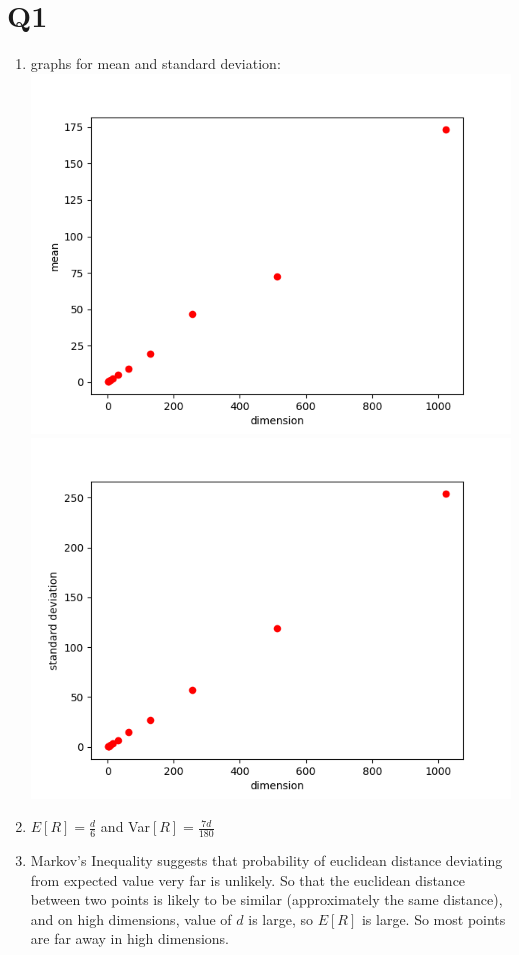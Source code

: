 \documentclass[12pt]{article}
\begin{document}
	
	\section*{Q1}
	\begin{enumerate}[label=\alph*)]
		\item graphs for mean and standard deviation:\\
		\includegraphics[scale=0.7]{q1a1}\\
		\includegraphics[scale=0.7]{q1a2}
		\item $E[R]=\frac{d}{6}$ and Var$[R]=\frac{7d}{180}$
		\item Markov's Inequality suggests that probability of euclidean distance deviating from expected value very far is unlikely. So that the euclidean distance between two points is likely to be similar (approximately the same distance), and on high dimensions, value of $d$ is large, so $E[R]$ is large. So most points are far away in high dimensions.
	\end{enumerate}
\end{document}

